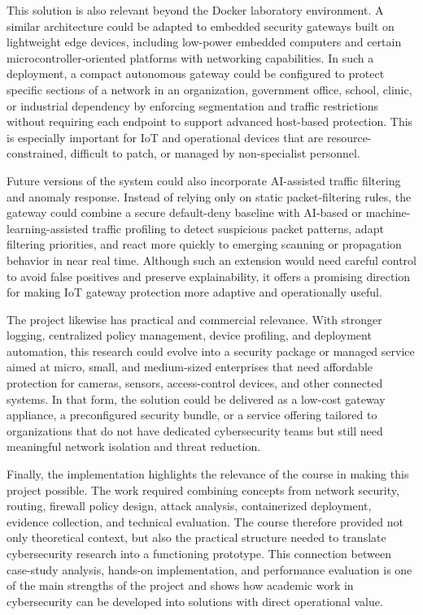 \documentclass[journal]{IEEEtran}
\begin{document}
This solution is also relevant beyond the Docker laboratory environment. A similar architecture could be adapted to embedded security gateways built on lightweight edge devices, including low-power embedded computers and certain microcontroller-oriented platforms with networking capabilities. In such a deployment, a compact autonomous gateway could be configured to protect specific sections of a network in an organization, government office, school, clinic, or industrial dependency by enforcing segmentation and traffic restrictions without requiring each endpoint to support advanced host-based protection. This is especially important for IoT and operational devices that are resource-constrained, difficult to patch, or managed by non-specialist personnel.

Future versions of the system could also incorporate AI-assisted traffic filtering and anomaly response. Instead of relying only on static packet-filtering rules, the gateway could combine a secure default-deny baseline with AI-based or machine-learning-assisted traffic profiling to detect suspicious packet patterns, adapt filtering priorities, and react more quickly to emerging scanning or propagation behavior in near real time. Although such an extension would need careful control to avoid false positives and preserve explainability, it offers a promising direction for making IoT gateway protection more adaptive and operationally useful.

The project likewise has practical and commercial relevance. With stronger logging, centralized policy management, device profiling, and deployment automation, this research could evolve into a security package or managed service aimed at micro, small, and medium-sized enterprises that need affordable protection for cameras, sensors, access-control devices, and other connected systems. In that form, the solution could be delivered as a low-cost gateway appliance, a preconfigured security bundle, or a service offering tailored to organizations that do not have dedicated cybersecurity teams but still need meaningful network isolation and threat reduction.

Finally, the implementation highlights the relevance of the course in making this project possible. The work required combining concepts from network security, routing, firewall policy design, attack analysis, containerized deployment, evidence collection, and technical evaluation. The course therefore provided not only theoretical context, but also the practical structure needed to translate cybersecurity research into a functioning prototype. This connection between case-study analysis, hands-on implementation, and performance evaluation is one of the main strengths of the project and shows how academic work in cybersecurity can be developed into solutions with direct operational value.
\end{document}
